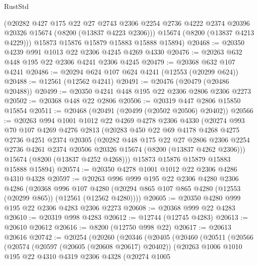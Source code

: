 \begin{lexlean}{RustStd}
\begin{coremodule}
        (@20282
          @427
          @175
          @22
          @27
          @2743
          @2306
          @2254
          @2736
          @4222
          @2374
          @20396
          @20326
          @15674
          (@8200 (@13837 @4223 @2306)))
        @15674
        (@8200 (@13837 @4213 @4229)))
      @15873
      @15876
      @15879
      @15883
      @15888
      @15894)
@20468 := @20350 @4239 @991 @1013 @22 @2306 @4245 @4269 @4330
@20476 := @20263 @632 @448 @195 @22 @2306 @4241 @2306 @4245
@20479 := @20368 @632 @107 @4241
@20486 := @20294 @624 @107 @624 @4241 (@12553 (@20299 @624))
@20488 := @12561 (@12562 @4241)
@20491 := @20476 (@20479 (@20486 @20488))
@20499 := @20350 @4241 @448 @195 @22 @2306 @2806 @2306 @2273
@20502 := @20368 @448 @22 @2806
@20506 := @20319 @447 @2806 @15850 @15854
@20511 := @20468 (@20491 (@20499 (@20502 @20506) @20402))
@20566 := @20263
    @994
    @1001
    @1012
    @22
    @4269
    @4278
    @2306
    @4330
    (@20274
      @993
      @70
      @107
      @4269
      @4276
      @2813
      (@20283
        @450
        @22
        @69
        @4178
        @4268
        @4275
        @2736
        @4251
        @2374
        @20305
        (@20282
          @448
          @175
          @22
          @27
          @2806
          @2306
          @2254
          @2736
          @4261
          @2374
          @20506
          @20326
          @15674
          (@8200 (@13837 @4262 @2306)))
        @15674
        (@8200 (@13837 @4252 @4268)))
      @15873
      @15876
      @15879
      @15883
      @15888
      @15894)
@20574 := @20350 @4278 @1001 @1012 @22 @2306 @4286 @4310 @4328
@20597 := @20263
    @996
    @999
    @195
    @22
    @2306
    @4280
    @2306
    @4286
    (@20368
      @996
      @107
      @4280
      (@20294 @865 @107 @865 @4280 (@12553 (@20299 @865)) (@12561 (@12562 @4280))))
@20605 := @20350 @4280 @999 @195 @22 @2306 @4283 @2306 @2273
@20608 := @20368 @999 @22 @4283
@20610 := @20319 @998 @4283
@20612 := @12744 (@12745 @4283)
@20613 := @20610 @20612
@20616 := @8200 (@12750 @998 @22)
@20617 := @20613 @20616
@20742 := @20254
    (@20260
      (@20346
        (@20405
          (@20460
            (@20511
              (@20566
                (@20574
                  (@20597 (@20605 (@20608 @20617) @20402))
                  (@20263
                    @1006
                    @1010
                    @195
                    @22
                    @4310
                    @4319
                    @2306
                    @4328
                    (@20274
                      @1005

\end{coremodule}
\end{lexlean}

